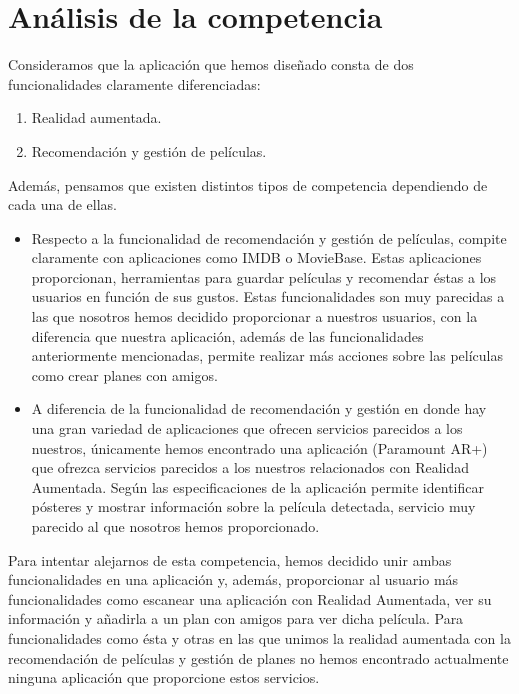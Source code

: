 \section{Análisis de la competencia}
\label{makereference3.1}
    Consideramos que la aplicación que hemos diseñado consta de dos funcionalidades claramente diferenciadas:
    \begin{enumerate}
    \item Realidad aumentada.
    \item Recomendación y gestión de películas.
    \end{enumerate}
    Además, pensamos que existen distintos tipos de competencia dependiendo de cada una de ellas.
     \begin{itemize}  
         \item Respecto a la funcionalidad de recomendación y gestión de películas, compite claramente con aplicaciones como IMDB\cite{imdb} o MovieBase\cite{moviebase}. 
         Estas aplicaciones proporcionan, herramientas para guardar películas y recomendar éstas a los usuarios en función de sus gustos. Estas funcionalidades son 
         muy parecidas a las que nosotros hemos decidido proporcionar a nuestros usuarios, con la diferencia que nuestra aplicación, además de las funcionalidades anteriormente 
         mencionadas, permite realizar más acciones sobre las películas como crear planes con amigos.
        \item A diferencia de la funcionalidad de recomendación y gestión en donde hay una gran variedad de aplicaciones que ofrecen servicios parecidos a los nuestros, únicamente hemos 
        encontrado una aplicación (Paramount AR+\cite{paramountar}) que ofrezca servicios parecidos a los nuestros relacionados con Realidad Aumentada. Según las especificaciones de la aplicación permite identificar pósteres y 
        mostrar información sobre la película detectada, servicio muy parecido al que nosotros hemos proporcionado. 
    \end{itemize}
    
Para intentar alejarnos de esta competencia, hemos decidido unir ambas funcionalidades en una aplicación y, además, proporcionar al usuario más funcionalidades como escanear una aplicación con Realidad Aumentada, 
 ver su información y añadirla a un plan con amigos para ver dicha película. Para funcionalidades como ésta y otras en las que unimos la realidad aumentada con la recomendación de películas y gestión de planes no hemos encontrado 
 actualmente ninguna aplicación que proporcione estos servicios.

